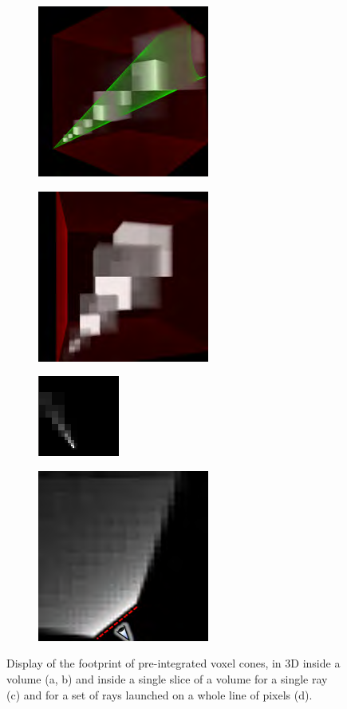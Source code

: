 \begin{figure}\label{f:vct-cone-footprints}
	\begin{subfigure}[b]{0.24\textwidth}
		\includegraphics{graphics/vct/vct-8-1}
		\caption{}
	\end{subfigure}
	\begin{subfigure}[b]{0.24\textwidth}
		\includegraphics{graphics/vct/vct-8-2}
		\caption{}
	\end{subfigure}
	\begin{subfigure}[b]{0.24\textwidth}
		\includegraphics{graphics/vct/vct-8-3}
		\caption{}
	\end{subfigure}
	\begin{subfigure}[b]{0.24\textwidth}
		\includegraphics{graphics/vct/vct-8-4}
		\caption{}
	\end{subfigure}
	\caption{Display of the footprint of pre-integrated voxel cones, in 3D inside a volume (a, b) and inside a single slice of a volume for a single ray (c) and for a set of rays launched on a whole line of pixels (d).}
\end{figure}

